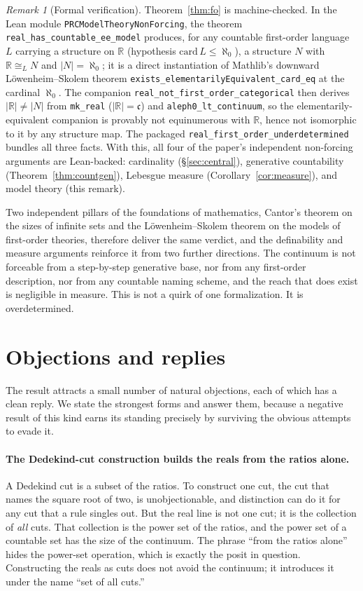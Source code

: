 \documentclass[11pt,a4paper]{article}
\theoremstyle{definition}
\theoremstyle{remark}
\newtheorem*{remark}{Remark}
\begin{document}
\begin{remark}[Formal verification]
Theorem~\ref{thm:fo} is machine-checked. In the Lean module
\texttt{PRCModelTheoryNonForcing}, the theorem
\texttt{real\_has\_countable\_ee\_model} produces, for any countable first-order
language $L$ carrying a structure on $\mathbb{R}$ (hypothesis
$\mathrm{card}\,L \le \aleph_0$), a structure $N$ with
$\mathbb{R} \cong_{L} N$ and $|N| = \aleph_0$; it is a direct instantiation of
Mathlib's downward L\"owenheim--Skolem theorem
\texttt{exists\_elementarilyEquivalent\_card\_eq} at the cardinal $\aleph_0$.
The companion \texttt{real\_not\_first\_order\_categorical} then derives
$|\mathbb{R}| \ne |N|$ from \texttt{mk\_real}
($|\mathbb{R}| = \mathfrak{c}$) and \texttt{aleph0\_lt\_continuum}, so the
elementarily-equivalent companion is provably not equinumerous with
$\mathbb{R}$, hence not isomorphic to it by any structure map. The packaged
\texttt{real\_first\_order\_underdetermined} bundles all three facts. With this,
all four of the paper's independent non-forcing arguments are Lean-backed:
cardinality (\S\ref{sec:central}), generative countability
(Theorem~\ref{thm:countgen}), Lebesgue measure (Corollary~\ref{cor:measure}),
and model theory (this remark).
\end{remark}

Two independent pillars of the foundations of mathematics, Cantor's theorem on
the sizes of infinite sets and the L\"owenheim--Skolem theorem on the models of
first-order theories, therefore deliver the same verdict, and the definability
and measure arguments reinforce it from two further directions. The continuum is
not forceable from a step-by-step generative base, nor from any first-order
description, nor from any countable naming scheme, and the reach that does exist
is negligible in measure. This is not a quirk of one formalization. It is
overdetermined.

\section{Objections and replies}\label{sec:objections}

The result attracts a small number of natural objections, each of which has a
clean reply. We state the strongest forms and answer them, because a negative
result of this kind earns its standing precisely by surviving the obvious
attempts to evade it.

\paragraph{The Dedekind-cut construction builds the reals from the ratios alone.}
A Dedekind cut is a subset of the ratios. To construct one cut, the cut that names
the square root of two, is unobjectionable, and distinction can do it for any cut
that a rule singles out. But the real line is not one cut; it is the collection of
\emph{all} cuts. That collection is the power set of the ratios, and the power
set of a countable set has the size of the continuum. The phrase ``from the ratios
alone'' hides the power-set operation, which is exactly the posit in question.
Constructing the reals as cuts does not avoid the continuum; it introduces it
under the name ``set of all cuts.''
\end{document}
